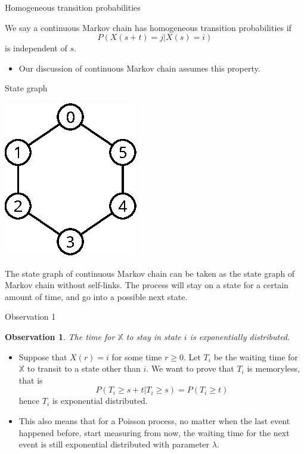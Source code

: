 \documentclass[mathserif]{beamer}
\newtheorem{obs}{Observation}
\begin{document}
\begin{frame}{Homogeneous transition probabilities}
\begin{definition}
We say a continuous Markov chain has homogeneous transition probabilities if 
\[
P(X(s+t) = j | X(s) = i)
\]
is independent of $s$.
\end{definition}
\begin{itemize}
\item Our discussion of continuous Markov chain assumes this property.
\end{itemize}
\end{frame}

\begin{frame}{State graph}
\begin{center}
\includegraphics[scale=1.0]{state_graph}
\end{center}
The state graph of continuous Markov chain can be taken as the state graph of Markov chain without self-links.
The process will stay on a state for a certain amount of time, and go into a possible next state.
\end{frame}

\begin{frame}{Observation 1}
\begin{obs}
The time for $\mathbb{X}$ to stay in state $i$ is exponentially distributed.
\end{obs}
\begin{itemize}
\item Suppose that $X(r) = i$ for some time $r\geq 0$.
Let $T_i$ be the waiting time for $\mathbb{X}$ to transit to a state other than $i$.
We want to prove that $T_i$ is memoryless, that is
\[
P(T_i\geq s+t | T_i\geq s) = P(T_i\geq t)
\]
hence $T_i$ is exponential distributed.
\item This also means that for a Poisson process, no matter when the last event happened before, start measuring from now, the waiting time for the next event is still exponential distributed with parameter $\lambda$.
\end{itemize}
\end{frame}
\end{document}
